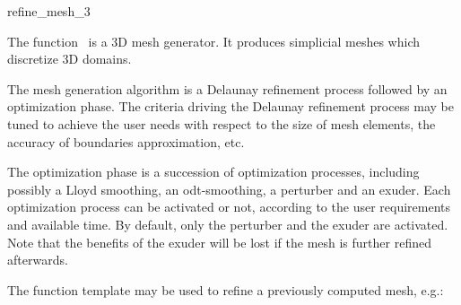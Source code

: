 \ccRefPageBegin


\begin{ccRefFunction}{refine_mesh_3}  %


\ccDefinition

The function \ccRefName\ is a 3D
 mesh generator. It produces simplicial meshes which discretize
 3D domains.

The mesh generation algorithm is a Delaunay refinement process
followed by an optimization phase. 
The  criteria driving the Delaunay refinement
process may be tuned to achieve the user needs with respect to
the size of mesh elements, the accuracy of boundaries approximation,
etc.

The optimization phase is a succession of optimization processes,
including possibly a Lloyd smoothing, an odt-smoothing,
a perturber and an exuder.
 Each optimization process
can be activated or not,
 according to the user requirements
and available time. 
By default, only the perturber and  the exuder are activated.
Note that the benefits of the exuder will be lost if the mesh
is further refined  afterwards.
 








\begin{ccAdvanced}
The function template \ccRefName{} may be used to refine a previously
computed mesh, e.g.:


\end{ccAdvanced}
\end{ccRefFunction}
